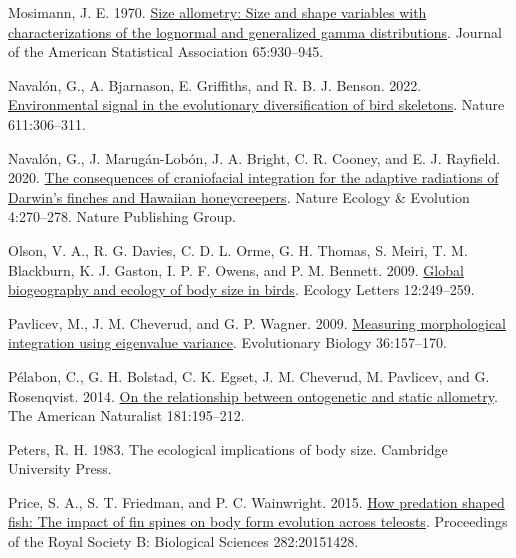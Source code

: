 \documentclass[
  11pt,
]{article}
\newlength{\cslhangindent}
\newlength{\cslentryspacingunit} %
\newenvironment{CSLReferences}[2] %
 {%
  \setlength{\parindent}{0pt}
  \ifodd #1
  \let\oldpar\par
  \def\par{\hangindent=\cslhangindent\oldpar}
  \fi
  \setlength{\parskip}{#2\cslentryspacingunit}
 }%
 {}
\begin{document}
\begin{CSLReferences}{1}{0}
\leavevmode{}%
Mosimann, J. E. 1970.
\href{https://doi.org/10.1080/01621459.1970.10481136}{Size allometry:
Size and shape variables with characterizations of the lognormal and
generalized gamma distributions}. Journal of the American Statistical
Association 65:930--945.

\leavevmode{}%
Navalón, G., A. Bjarnason, E. Griffiths, and R. B. J. Benson. 2022.
\href{https://doi.org/10.1038/s41586-022-05372-y}{{Environmental signal
in the evolutionary diversification of bird skeletons}}. Nature
611:306--311.

\leavevmode{}%
Navalón, G., J. Marugán-Lobón, J. A. Bright, C. R. Cooney, and E. J.
Rayfield. 2020. \href{https://doi.org/10.1038/s41559-019-1092-y}{The
consequences of craniofacial integration for the adaptive radiations of
{D}arwin's finches and {H}awaiian honeycreepers}. Nature Ecology \&
Evolution 4:270--278. Nature Publishing Group.

\leavevmode{}%
Olson, V. A., R. G. Davies, C. D. L. Orme, G. H. Thomas, S. Meiri, T. M.
Blackburn, K. J. Gaston, I. P. F. Owens, and P. M. Bennett. 2009.
\href{https://doi.org/10.1111/j.1461-0248.2009.01281.x}{Global
biogeography and ecology of body size in birds}. Ecology Letters
12:249--259.

\leavevmode{}%
Pavlicev, M., J. M. Cheverud, and G. P. Wagner. 2009.
\href{https://doi.org/10.1007/s11692-008-9042-7}{Measuring morphological
integration using eigenvalue variance}. Evolutionary Biology
36:157--170.

\leavevmode{}%
Pélabon, C., G. H. Bolstad, C. K. Egset, J. M. Cheverud, M. Pavlicev,
and G. Rosenqvist. 2014. \href{https://doi.org/10.1086/668820}{On the
relationship between ontogenetic and static allometry}. The American
Naturalist 181:195--212.

\leavevmode{}%
Peters, R. H. 1983. The ecological implications of body size. Cambridge
University Press.

\leavevmode{}%
Price, S. A., S. T. Friedman, and P. C. Wainwright. 2015.
\href{https://doi.org/10.1098/rspb.2015.1428}{How predation shaped fish:
The impact of fin spines on body form evolution across teleosts}.
Proceedings of the Royal Society B: Biological Sciences 282:20151428.


\end{CSLReferences}
\end{document}
